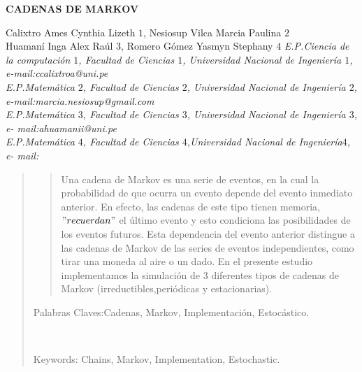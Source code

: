 \documentclass[10pt,a4paper]{article}
\theoremstyle{definition}
\theoremstyle{remark}
\begin{document}
\begin{center}
 {\Large \textbf{CADENAS DE MARKOV}}
\end{center}
\begin{center}
Calixtro Ames Cynthia Lizeth $1$, Nesiosup Vilca Marcia Paulina $2$\\
Huamaní Inga Alex Raúl $3$, Romero Gómez Yasmyn Stephany $4$\vskip12pt
{\it E.P.Ciencia de la computación $1$, Facultad de Ciencias $1$, Universidad Nacional de Ingeniería $1$, e-mail:ccalixtroa@uni.pe \\E.P.Matemática $2$, Facultad de Ciencias $2$, Universidad Nacional de Ingeniería $2$, e-mail:marcia.nesiosup@gmail.com \\ E.P.Matemática $3$, Facultad de Ciencias $3$, Universidad Nacional de Ingeniería $3$, e-
mail:ahuamanii@uni.pe \\E.P.Matemática $4$, Facultad de Ciencias $4$,Universidad Nacional de Ingeniería$4$, e- mail:}
\end{center}
\begin{quotation}
{\small
\begin{abstract}
\noindent  Una cadena de Markov es una serie de eventos, en la cual la probabilidad de que ocurra un evento depende del evento inmediato anterior. En efecto, las cadenas de este tipo tienen memoria, $"recuerdan"$ el último evento y esto condiciona las posibilidades de los eventos futuros. Esta dependencia del evento anterior distingue a las cadenas de Markov de las series de eventos independientes, como tirar una moneda al aire o un dado. En el presente estudio implementamos la simulación de 3 diferentes tipos de cadenas de Markov (irreductibles,periódicas y estacionarias).

\end{abstract}
\hspace*{0.5cm} Palabras Claves:Cadenas, Markov, Implementación, Estocástico.  
}\\
{\small
\hspace*{0.5cm} 

Keywords: Chains, Markov, Implementation, Estochastic. \\ 
}
\end{quotation}
\end{document}
